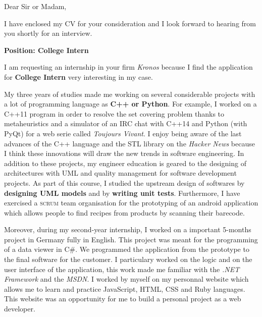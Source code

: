 \date{\today}
\opening{Dear Sir or Madam,}
\closing{I have enclosed my CV for your consideration and I look forward to hearing from you shortly for an interview.}

\makelettertitle

\textbf{Position: College Intern}

\introduce{}
I am requesting an internship in your firm \textit{Kronos} because I find the application for \textbf{College Intern} very interesting in my case.

My three years of studies made me working on several considerable projects with a lot of programming language as \textbf{C++ or Python}. For example, I worked on a C++11 program in order to resolve the set covering problem thanks to metaheuristics and a simulator of an IRC chat with C++14 and Python (with PyQt) for a web serie called \textit{Toujours Vivant}. I enjoy being aware of the last advances of the C++ language and the STL library on the \textit{Hacker News} because I think these innovations will draw the new trends in software engineering. In addition to these projects, my engineer education is geared to the designing of architectures with UML and quality management for software development projects. As part of this course, I studied the upstream design of softwares by \textbf{designing UML models} and by \textbf{writing unit tests}. Furthermore, I have exercised a \textsc{scrum} team organisation for the prototyping of an android application which allows people to find recipes from products by scanning their barecode.

Moreover, during my second-year internship, I worked on a important 5-months project in Germany fully in English. This project was meant for the programming of a data viewer in C\#. We programmed the application from the prototype to the final software for the customer. I particulary worked on the logic and on the user interface of the application, this work made me familiar with the \textit{.NET Framework} and the \textit{MSDN}. I worked by myself on my personnal website which allows me to learn and practice JavaScript, HTML, CSS and Ruby languages. This website was an opportunity for me to build a personal project as a web developer. \conclude{}

\makeletterclosing
